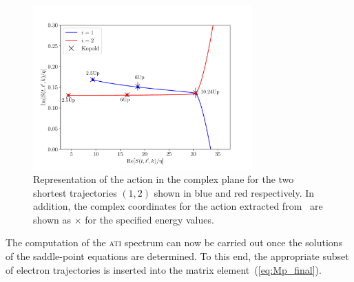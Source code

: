 

\begin{figure}
  \centering \includegraphics[width =
    0.75\textwidth]{figures/ch_ATI_SPA/rescattering/phase_ComplexReIm.pdf}
  \caption{Representation of the action in the complex plane for the
    two shortest trajectories $(1, 2)$ shown in blue and red
    respectively. In addition, the complex coordinates for the action
    extracted from~\cite{phd_Kopold} are shown as $\times$ for the
    specified energy values.}
  \label{fig:phase_ReIm}
\end{figure}


The computation of the \textsc{ati} spectrum can now be carried out
once the solutions of the saddle-point equations are determined. To
this end, the appropriate subset of electron trajectories is inserted
into the matrix element~(\ref{eq:Mp_final}).









